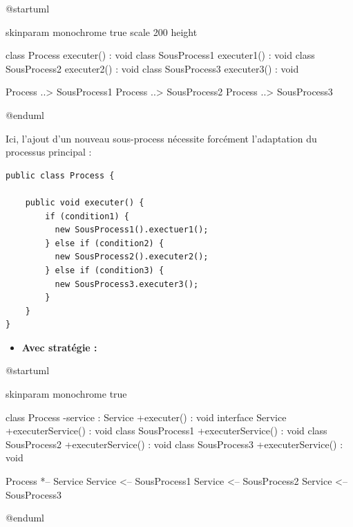 \documentclass[a4paper, 12pt]{report}
\begin{document}
\begin{center}
  \begin{plantuml}
    @startuml

    skinparam monochrome true
    scale 200 height

    class Process {
      executer() : void
    }
    class SousProcess1 {
      executer1() : void
    }
    class SousProcess2 {
      executer2() : void
    }
    class SousProcess3 {
      executer3() : void
    }

    Process ..> SousProcess1
    Process ..> SousProcess2
    Process ..> SousProcess3

    @enduml
  \end{plantuml}
\end{center}
\clearpage

Ici, l'ajout d'un nouveau sous-process nécessite forcément l'adaptation du processus principal :\\

\begin{lstlisting}
public class Process {

    public void executer() {
        if (condition1) {
          new SousProcess1().exectuer1();
        } else if (condition2) {
          new SousProcess2().executer2();
        } else if (condition3) {
          new SousProcess3.executer3();
        }
    }    
}
\end{lstlisting}
\vspace{0.5cm}

\begin{itemize}
  \item \textbf{Avec stratégie :}\\
\end{itemize}

\begin{center}
  \begin{plantuml}
    @startuml

    skinparam monochrome true

    class Process {
      -service : Service
      +executer() : void
    }
    interface Service {
      +executerService() : void
    }
    class SousProcess1 {
      +executerService() : void
    }
    class SousProcess2 {
      +executerService() : void
    }
    class SousProcess3 {
      +executerService() : void
    }

    Process *-- Service
    Service <-- SousProcess1
    Service <-- SousProcess2
    Service <-- SousProcess3

    @enduml
  \end{plantuml}
\end{center}
\clearpage
\end{document}
